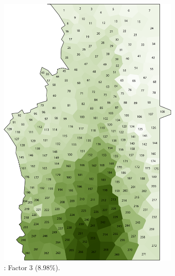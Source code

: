 \documentclass[output=paper]{LSP/langsci}
\begin{document}
\begin{figure}
\begin{subfigure}[t]{0.3\textwidth}
\includegraphics[width=\textwidth]{illustrations/pickl_fig4}
\caption{: Factor 3 (8.98\%).}
\label{fig:pickl:4}
\end{subfigure}  
~
\begin{subfigure}[t]{0.3\textwidth}

\end{subfigure}
\end{figure}
\end{document}
